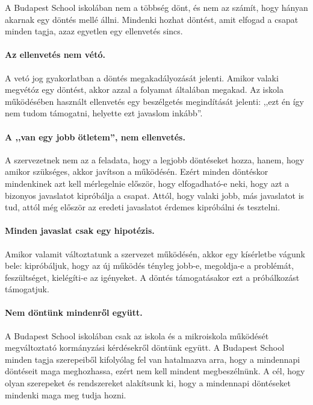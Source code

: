A Budapest School iskolában nem a többség dönt, és nem az számít, hogy
hányan akarnak egy döntés mellé állni. Mindenki hozhat döntést, amit
elfogad a csapat minden tagja, azaz egyetlen egy ellenvetés sincs.


\paragraph{Az ellenvetés nem
vétó.}

A vetó jog gyakorlatban a döntés megakadályozását jelenti. Amikor valaki
megvétóz egy döntést, akkor azzal a folyamat általában megakad. Az
iskola működésében használt ellenvetés egy beszélgetés megindítását
jelenti: ,,ezt én így nem tudom támogatni, helyette ezt javaslom
inkább''.


\paragraph{A ,,van egy jobb ötletem'', nem
ellenvetés.}

A szervezetnek nem az a feladata, hogy a legjobb döntéseket hozza,
hanem, hogy amikor szükséges, akkor javítson a működésén. Ezért minden
döntéskor mindenkinek azt kell mérlegelnie először, hogy elfogadható-e
neki, hogy azt a bizonyos javaslatot kipróbálja a csapat. Attól, hogy
valaki jobb, más javaslatot is tud, attól még először az eredeti
javaslatot érdemes kipróbálni és tesztelni.


\paragraph{Minden javaslat csak egy
hipotézis.}

Amikor valamit változtatunk a szervezet működésén, akkor egy kísérletbe
vágunk bele: kipróbáljuk, hogy az új működés tényleg jobb-e, megoldja-e
a problémát, feszültséget, kielégíti-e az igényeket. A döntés
támogatásakor ezt a próbálkozást támogatjuk.


\paragraph{Nem döntünk mindenről
együtt.}

A Budapest School iskolában csak az iskola és a mikroiskola működését
megváltoztató kormányzási kérdésekről döntünk együtt. A Budapest School
minden tagja szerepeiből kifolyólag fel van hatalmazva arra, hogy a
mindennapi döntéseit maga meghozhassa, ezért nem kell mindent
megbeszélnünk. A cél, hogy olyan szerepeket és rendszereket alakítsunk
ki, hogy a mindennapi döntéseket mindenki maga meg tudja hozni.


